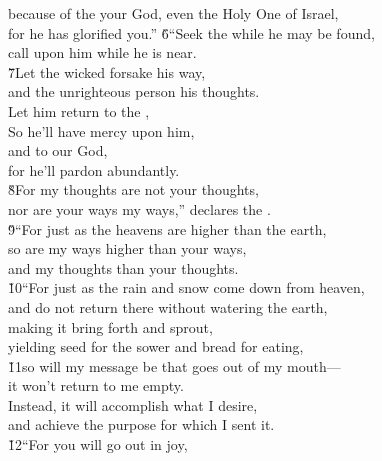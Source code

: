 \begin{poetry}
\poeml because of the  your God, even the Holy One of Israel, \\
\poemll    for he has glorified you.''
\poeml \v{6}``Seek the  while he may be found, \\
\poemll    call upon him while he is near. \\
\poeml \v{7}Let the wicked forsake his way, \\
\poemll    and the unrighteous person his thoughts. \\
\poeml Let him return to the , \\
\poemll    So he'll have mercy upon him, \\
\poeml and to our God, \\
\poemll    for he'll pardon abundantly. \\
\poeml \v{8}For my thoughts are not your thoughts, \\
\poemll    nor are your ways my ways,'' declares the . \\
\poeml \v{9}``For just as the heavens are higher than the earth, \\
\poemll    so are my ways higher than your ways, \\
\poemlll       and my thoughts than your thoughts. \\
\poeml \v{10}``For just as the rain and snow come down from heaven, \\
\poemll    and do not return there without watering the earth, \\
\poeml making it bring forth and sprout, \\
\poemll    yielding seed for the sower and bread for eating, \\
\poeml \v{11}so will my message be that goes out of my mouth--- \\
\poemll    it won't return to me empty. \\
\poeml Instead, it will accomplish what I desire, \\
\poemll    and achieve the purpose for which I sent it. \\
\poeml \v{12}``For you will go out in joy, \\

\end{poetry}
